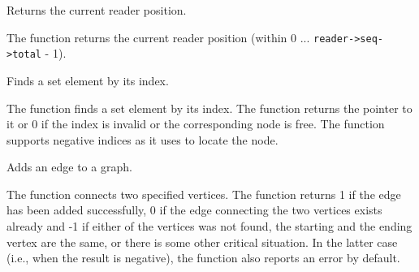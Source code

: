 Returns the current reader position.


\begin{description}
\end{description}


The function returns the current reader position (within 0 ... \texttt{reader->seq->total} - 1).

Finds a set element by its index.


\begin{description}
\end{description}

The function finds a set element by its index. The function returns the pointer to it or 0 if the index is invalid or the corresponding node is free. The function supports negative indices as it uses  to locate the node.

Adds an edge to a graph.


\begin{description}
\end{description}


The function connects two specified vertices. The function returns 1 if the edge has been added successfully, 0 if the edge connecting the two vertices exists already and -1 if either of the vertices was not found, the starting and the ending vertex are the same, or there is some other critical situation. In the latter case (i.e., when the result is negative), the function also reports an error by default.

